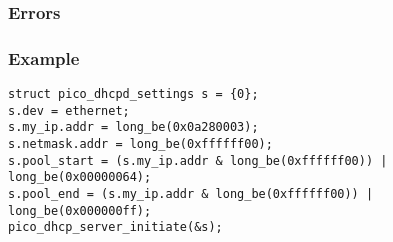 \subsubsection*{Errors}

\subsubsection*{Example}
\begin{verbatim}
struct pico_dhcpd_settings s = {0};
s.dev = ethernet;
s.my_ip.addr = long_be(0x0a280003);
s.netmask.addr = long_be(0xffffff00);
s.pool_start = (s.my_ip.addr & long_be(0xffffff00)) | long_be(0x00000064);
s.pool_end = (s.my_ip.addr & long_be(0xffffff00)) | long_be(0x000000ff);
pico_dhcp_server_initiate(&s);
\end{verbatim}


